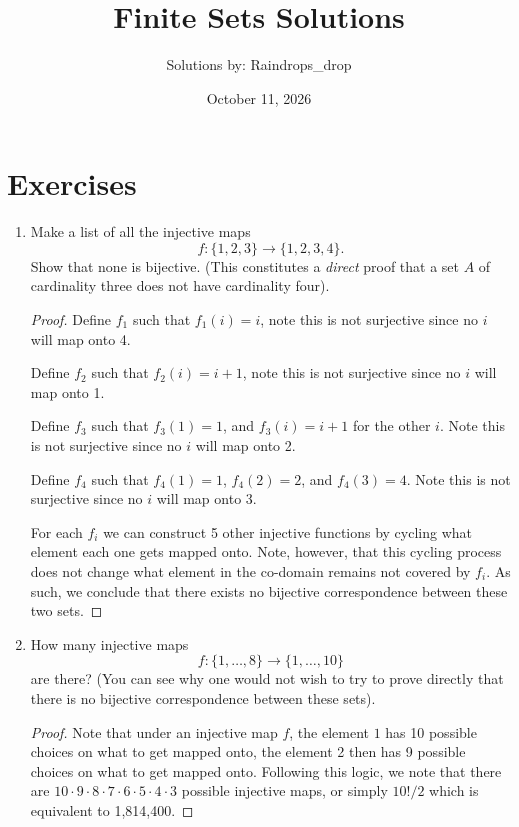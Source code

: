 \documentclass[12pt]{article}
\begin{document}
	\title{Finite Sets Solutions}
	\author{Solutions by: Raindrops\_drop}
	\date{October 11, 2026}
	\maketitle
	
	\section*{Exercises}

    \begin{enumerate}[label=(\alph*)]
        \item Make a list of all the injective maps 
        $$
        f: \{1, 2, 3\} \to \{1, 2, 3, 4\}.
        $$
        Show that none is bijective. (This constitutes a \textit{direct}
        proof that a set $A$ of cardinality three does not have cardinality
        four).
        \begin{proof}
            Define $f_1$ such that $f_1(i) = i$, note this is not surjective since
            no $i$ will map onto 4.

            Define $f_2$ such that $f_2(i) = i + 1$, note this is not surjective 
            since no $i$ will map onto 1.

            Define $f_3$ such that $f_3(1) = 1$, and $f_3(i) = i + 1$ for 
            the other $i$. Note this is not surjective since no $i$ will map
            onto 2.

            Define $f_4$ such that $f_4(1) = 1$, $f_4(2) = 2$, and 
            $f_4(3) = 4$. Note this is not surjective since no $i$ will map onto 3.

            For each $f_i$ we can construct 5 other injective functions by cycling
            what element each one gets mapped onto. Note, however, that this
            cycling process does not change what element in the co-domain 
            remains not covered by $f_i$. As such, we conclude that 
            there exists no bijective correspondence between these two sets.
        \end{proof}
        \item How many injective maps 
        $$
        f: \{1, \ldots, 8\} \to \{1, \ldots, 10\}
        $$
        are there? (You can see why one would not wish to try to prove 
        directly that there is no bijective correspondence between these
        sets).
        \begin{proof}
            Note that under an injective map $f$, the element 
            $1$ has 10 possible choices on what to get mapped onto, the 
            element 2 then has 9 possible choices on what to get mapped onto.
            Following this logic, we note that there are 
            $10 \cdot 9 \cdot 8 \cdot 7 \cdot 6 \cdot 5 \cdot 4 \cdot 3$
            possible injective maps, or simply $10!/2$ which is equivalent 
            to 1,814,400.
        \end{proof}
    \end{enumerate}
\end{document}

